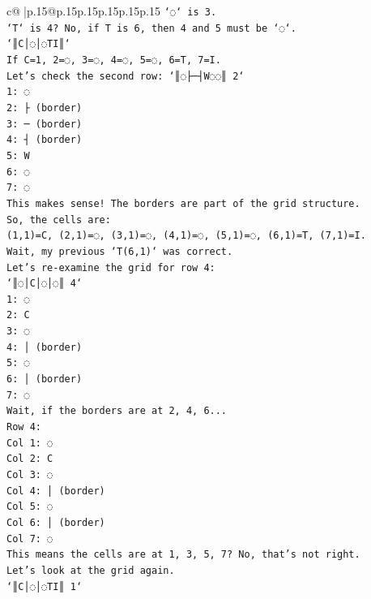 \documentclass{article}
\begin{document}
{\begin{supertabular}{c@{$\;$}|p{.15\linewidth}@{}p{.15\linewidth}p{.15\linewidth}p{.15\linewidth}p{.15\linewidth}p{.15\linewidth}}
{{{\texttt{`◌` is 3.} \\
\texttt{`T` is 4? No, if T is 6, then 4 and 5 must be `◌`.} \\
\texttt{`║C│◌│◌TI║`} \\
\texttt{If C=1, 2=◌, 3=◌, 4=◌, 5=◌, 6=T, 7=I.} \\
\texttt{Let's check the second row: `║◌├─┤W◌◌║ 2`} \\
\texttt{1: ◌} \\
\texttt{2: ├ (border)} \\
\texttt{3: ─ (border)} \\
\texttt{4: ┤ (border)} \\
\texttt{5: W} \\
\texttt{6: ◌} \\
\texttt{7: ◌} \\
\texttt{This makes sense! The borders are part of the grid structure.} \\
\texttt{So, the cells are:} \\
\texttt{(1,1)=C, (2,1)=◌, (3,1)=◌, (4,1)=◌, (5,1)=◌, (6,1)=T, (7,1)=I.} \\
\texttt{Wait, my previous `T(6,1)` was correct.} \\
\texttt{Let's re{-}examine the grid for row 4:} \\
\texttt{`║◌│C│◌│◌║ 4`} \\
\texttt{1: ◌} \\
\texttt{2: C} \\
\texttt{3: ◌} \\
\texttt{4: │ (border)} \\
\texttt{5: ◌} \\
\texttt{6: │ (border)} \\
\texttt{7: ◌} \\
\texttt{Wait, if the borders are at 2, 4, 6...} \\
\texttt{Row 4:} \\
\texttt{Col 1: ◌} \\
\texttt{Col 2: C} \\
\texttt{Col 3: ◌} \\
\texttt{Col 4: │ (border)} \\
\texttt{Col 5: ◌} \\
\texttt{Col 6: │ (border)} \\
\texttt{Col 7: ◌} \\
\texttt{This means the cells are at 1, 3, 5, 7? No, that's not right.} \\
\texttt{Let's look at the grid again.} \\
\texttt{`║C│◌│◌TI║ 1`} \\
}}}
\end{supertabular}}
\end{document}
